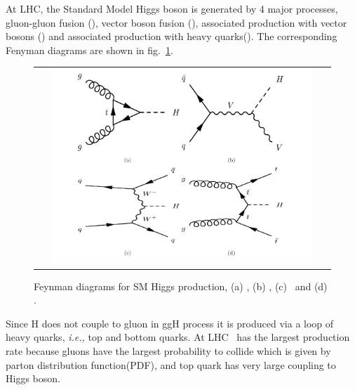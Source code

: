 At LHC, the Standard Model Higgs boson is generated by 4 major processes, 
gluon-gluon fusion (\ggH), 
vector boson fusion (\qqH),
associated production with vector bosons (\qqVH) and 
associated production with heavy quarks(\ttH).
The corresponding Fenyman diagrams are shown in fig.~\ref{fig:FD_HiggsProduction}.
\begin{figure}[htp] 
\centering 
\begin{tabular}{c} 
\includegraphics[width=0.9\textwidth]{figures/FD_HiggsProduction.pdf} 
\end{tabular} 
\caption{Feynman diagrams for SM Higgs production, (a) \ggH, (b) \qqVH, (c) \qqH\ and (d) \ttH.} 
\label{fig:FD_HiggsProduction} 
\end{figure} 
Since H does not couple to gluon in ggH process it is produced via a loop of 
heavy quarks, \textit{i.e.,} top and bottom quarks.
At LHC \ggH\ has the largest production rate because gluons have 
the largest probability to collide which is given by parton distribution function(PDF), 
and top quark has very large coupling to Higgs boson. 
